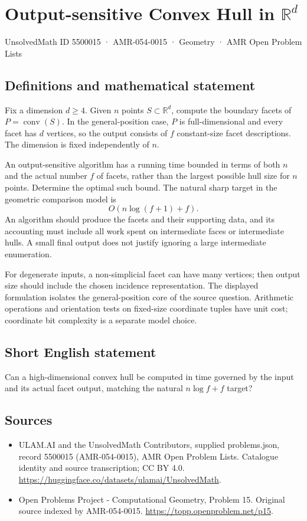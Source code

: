 \documentclass[11pt,a4paper]{article}
\begin{document}
\section*{Output-sensitive Convex Hull in $\mathbb{R}^d$}\label{5500015}
{\small UnsolvedMath ID 5500015 · AMR-054-0015 · Geometry · AMR Open Problem Lists}
\subsection{Definitions and mathematical statement}
Fix a dimension $d\ge4$. Given $n$ points $S\subset\mathbb R^d$, compute
the boundary facets of $P=\operatorname{conv}(S)$. In the general-position
case, $P$ is full-dimensional and every facet has $d$ vertices, so the
output consists of $f$ constant-size facet descriptions. The dimension
is fixed independently of $n$.

An output-sensitive algorithm has a running time bounded in terms of
both $n$ and the actual number $f$ of facets, rather than the largest
possible hull size for $n$ points. Determine the optimal such bound.
The natural sharp target in the geometric comparison model is
\[
                         O(n\log(f+1)+f).
\]
An algorithm should produce the facets and their supporting data, and
its accounting must include all work spent on intermediate faces or
intermediate hulls. A small final output does not justify ignoring a
large intermediate enumeration.

For degenerate inputs, a non-simplicial facet can have many vertices;
then output size should include the chosen incidence representation.
The displayed formulation isolates the general-position core of the
source question. Arithmetic operations and orientation tests on fixed-size
coordinate tuples have unit cost; coordinate bit complexity is a
separate model choice.
\subsection{Short English statement}
Can a high-dimensional convex hull be computed in time governed by
the input and its actual facet output, matching the natural
$n\log f+f$ target?
\subsection{Sources}
\begin{itemize}
\item[S1] ULAM.AI and the UnsolvedMath Contributors, supplied problems.json, record 5500015 (AMR-054-0015), AMR Open Problem Lists. Catalogue identity and source transcription; CC BY 4.0.
\url{https://huggingface.co/datasets/ulamai/UnsolvedMath}.
\item[S2] Open Problems Project - Computational Geometry, Problem 15. Original source indexed by AMR-054-0015.
\url{https://topp.openproblem.net/p15}.
\end{itemize}
\end{document}
